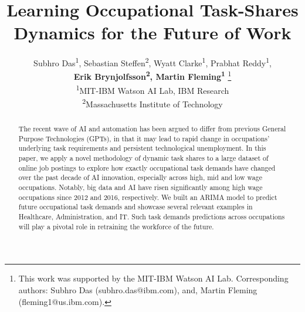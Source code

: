 \documentclass[letterpaper]{article} %
\title{Learning Occupational Task-Shares Dynamics for the Future of Work}
\author{Subhro Das\textsuperscript{\rm 1}, Sebastian Steffen\textsuperscript{\rm 2}, Wyatt Clarke\textsuperscript{\rm 1}, Prabhat Reddy\textsuperscript{\rm 1}, \\
{ \Large \bf Erik Brynjolfsson\textsuperscript{\rm 2}, Martin Fleming\textsuperscript{\rm 1} } \thanks{This work was supported by the MIT-IBM Watson AI Lab. Corresponding authors: Subhro Das (subhro.das@ibm.com), and, Martin Fleming (fleming1@us.ibm.com).}\\
\textsuperscript{\rm 1}MIT-IBM Watson AI Lab, IBM Research \\
\textsuperscript{\rm 2}Massachusetts Institute of Technology \\
}
\begin{document}
\maketitle

\begin{abstract}
The recent wave of AI and automation has been argued to differ from previous General Purpose Technologies (GPTs), in that it may lead to rapid change in occupations' underlying task requirements and persistent technological unemployment. In this paper, we apply a novel methodology of dynamic task shares to a large dataset of online job postings to explore how exactly occupational task demands have changed over the past decade of AI innovation, especially across high, mid and low wage occupations. Notably, big data and AI have risen significantly among high wage occupations since 2012 and 2016, respectively. We built an ARIMA model to predict future occupational task demands and showcase several relevant examples in Healthcare, Administration, and IT. Such task demands predictions across occupations will play a pivotal role in retraining the workforce of the future.
\end{abstract}
\end{document}
